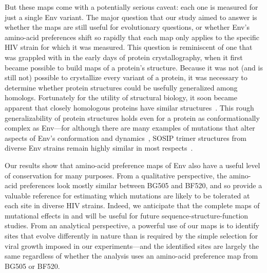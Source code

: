 \documentclass[9pt]{elife}
\begin{document}
But these maps come with a potentially serious caveat: each one is measured for just a single Env variant.
The major question that our study aimed to answer is whether the maps are still useful for evolutionary questions, or whether Env's amino-acid preferences shift so rapidly that each map only applies to the specific HIV strain for which it was measured.
This question is reminiscent of one that was grappled with in the early days of protein crystallography, when it first became possible to build maps of a protein's structure.
Because it was not (and is still not) possible to crystallize every variant of a protein, it was necessary to determine whether protein structures could be usefully generalized among homologs.
Fortunately for the utility of structural biology, it soon became apparent that closely homologous proteins have similar structures~\citep{chothia1986relation,sander1991database}.
This rough generalizability of protein structures holds even for a protein as conformationally complex as Env---for although there are many examples of mutations that alter aspects of Env's conformation and dynamics~\citep{kwong2000structures,white2010molecular,almond2010structural,davenport2013isolate}, SOSIP trimer structures from diverse Env strains remain highly similar in most respects~\citep{julien2015design,pugach2015native,stewart2016trimeric,verkerke2016epitope,gristick2016natively}.

Our results show that amino-acid preference maps of Env also have a useful level of conservation for many purposes.
From a qualitative perspective, the amino-acid preferences look mostly similar between BG505 and BF520, and so provide a valuable reference for estimating which mutations are likely to be tolerated at each site in diverse HIV strains.
Indeed, we anticipate that the complete maps of mutational effects in  and  will be useful for future sequence-structure-function studies.
From an analytical perspective, a powerful use of our maps is to identify sites that evolve differently in nature than is required by the simple selection for viral growth imposed in our experiments---and the identified sites are largely the same regardless of whether the analysis uses an amino-acid preference map from BG505 or BF520.
\end{document}
